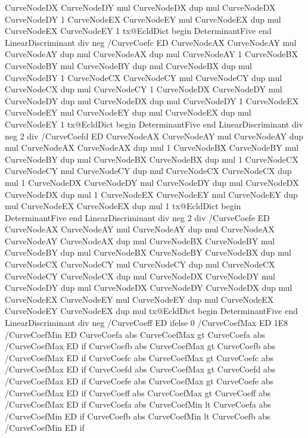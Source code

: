 {{        CurveNodeDX CurveNodeDY mul CurveNodeDX dup mul CurveNodeDX CurveNodeDY 1
        CurveNodeEX CurveNodeEY mul CurveNodeEX dup mul CurveNodeEX CurveNodeEY 1
        tx@EcldDict begin DeterminantFive end LinearDiscriminant div neg /CurveCoefc ED
        CurveNodeAX CurveNodeAY mul CurveNodeAY dup mul CurveNodeAX dup mul CurveNodeAY 1
        CurveNodeBX CurveNodeBY mul CurveNodeBY dup mul CurveNodeBX dup mul CurveNodeBY 1
        CurveNodeCX CurveNodeCY mul CurveNodeCY dup mul CurveNodeCX dup mul CurveNodeCY 1
        CurveNodeDX CurveNodeDY mul CurveNodeDY dup mul CurveNodeDX dup mul CurveNodeDY 1
        CurveNodeEX CurveNodeEY mul CurveNodeEY dup mul CurveNodeEX dup mul CurveNodeEY 1
        tx@EcldDict begin DeterminantFive end LinearDiscriminant div neg 2 div /CurveCoefd ED
        CurveNodeAX CurveNodeAY mul CurveNodeAY dup mul CurveNodeAX CurveNodeAX dup mul 1
        CurveNodeBX CurveNodeBY mul CurveNodeBY dup mul CurveNodeBX CurveNodeBX dup mul 1
        CurveNodeCX CurveNodeCY mul CurveNodeCY dup mul CurveNodeCX CurveNodeCX dup mul 1
        CurveNodeDX CurveNodeDY mul CurveNodeDY dup mul CurveNodeDX CurveNodeDX dup mul 1
        CurveNodeEX CurveNodeEY mul CurveNodeEY dup mul CurveNodeEX CurveNodeEX dup mul 1
        tx@EcldDict begin DeterminantFive end LinearDiscriminant div neg 2 div /CurveCoefe ED
        CurveNodeAX CurveNodeAY mul CurveNodeAY dup mul CurveNodeAX CurveNodeAY CurveNodeAX dup mul
        CurveNodeBX CurveNodeBY mul CurveNodeBY dup mul CurveNodeBX CurveNodeBY CurveNodeBX dup mul
        CurveNodeCX CurveNodeCY mul CurveNodeCY dup mul CurveNodeCX CurveNodeCY CurveNodeCX dup mul
        CurveNodeDX CurveNodeDY mul CurveNodeDY dup mul CurveNodeDX CurveNodeDY CurveNodeDX dup mul
        CurveNodeEX CurveNodeEY mul CurveNodeEY dup mul CurveNodeEX CurveNodeEY CurveNodeEX dup mul
        tx@EcldDict begin DeterminantFive end LinearDiscriminant div neg /CurveCoeff ED
      } ifelse
      0 /CurveCoefMax ED 1E8 /CurveCoefMin ED
      CurveCoefa abs CurveCoefMax gt {CurveCoefa abs /CurveCoefMax ED} if
      CurveCoefb abs CurveCoefMax gt {CurveCoefb abs /CurveCoefMax ED} if
      CurveCoefc abs CurveCoefMax gt {CurveCoefc abs /CurveCoefMax ED} if
      CurveCoefd abs CurveCoefMax gt {CurveCoefd abs /CurveCoefMax ED} if
      CurveCoefe abs CurveCoefMax gt {CurveCoefe abs /CurveCoefMax ED} if
      CurveCoeff abs CurveCoefMax gt {CurveCoeff abs /CurveCoefMax ED} if
      CurveCoefa abs CurveCoefMin lt {CurveCoefa abs /CurveCoefMin ED} if
      CurveCoefb abs CurveCoefMin lt {CurveCoefb abs /CurveCoefMin ED} if
}
